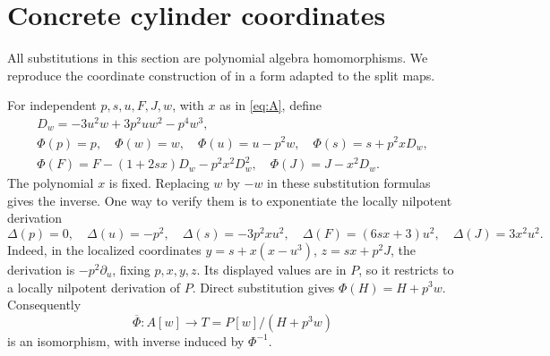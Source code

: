 \documentclass[11pt]{article}
\begin{document}
\section{Concrete cylinder coordinates}
All substitutions in this section are polynomial algebra homomorphisms.
We reproduce the coordinate construction of \cite[Section 2]{OAI} in
a form adapted to the split maps.

For independent $p,s,u,F,J,w$, with $x$ as in \eqref{eq:A}, define
\begin{equation}\label{eq:phi}
\begin{gathered}
D_w=-3u^2w+3p^2uw^2-p^4w^3,\\
\Phi(p)=p,\quad \Phi(w)=w,\quad
\Phi(u)=u-p^2w,\quad \Phi(s)=s+p^2xD_w,\\
\Phi(F)=F-(1+2sx)D_w-p^2x^2D_w^2,\quad
\Phi(J)=J-x^2D_w.
\end{gathered}
\end{equation}
The polynomial $x$ is fixed. Replacing $w$ by $-w$ in these substitution
formulas gives the inverse. One way to verify them is to exponentiate
the locally nilpotent derivation
\[
\Delta(p)=0,\quad\Delta(u)=-p^2,\quad
\Delta(s)=-3p^2xu^2,\quad
\Delta(F)=(6sx+3)u^2,\quad\Delta(J)=3x^2u^2.
\]
Indeed, in the localized coordinates
$y=s+x(x-u^3)$, $z=sx+p^2J$, the derivation is
$-p^2\partial_u$, fixing $p,x,y,z$. Its displayed values are in $P$,
so it restricts to a locally nilpotent derivation of $P$.
Direct substitution gives $\Phi(H)=H+p^3w$. Consequently
\begin{equation}\label{eq:T}
\overline\Phi:A[w]\longrightarrow
T=P[w]/(H+p^3w)
\end{equation}
is an isomorphism, with inverse induced by $\Phi^{-1}$.
\end{document}
